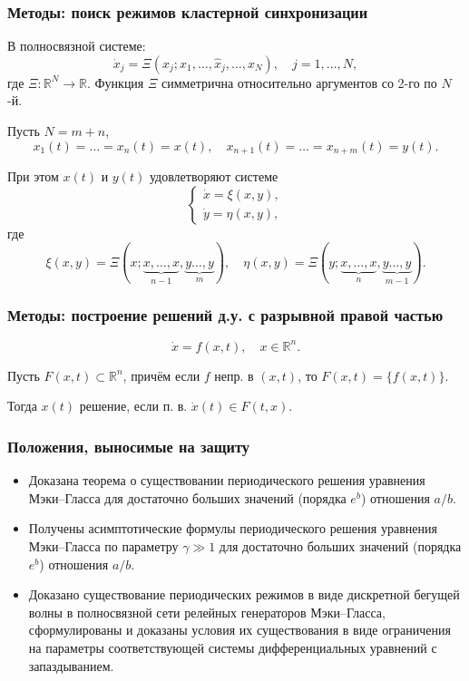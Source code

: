 \begin{frame}
	\frametitle{Методы: поиск режимов кластерной синхронизации}
	
	В полносвязной системе:
	\begin{equation*}
		\dot{x}_j = \Xi(x_j;x_1,\ldots,\hat{x}_j,\ldots,x_{N}),\quad j=1,\ldots,N,
	\end{equation*}
	где $\Xi:\mathbb{R}^{N}\to\mathbb{R}$. Функция $\Xi$ симметрична относительно аргументов со 2-го по $N$-й.
	
	\pause
	\bigskip
	
	Пусть $N = m + n$,
	\begin{equation}
		x_1(t)=\ldots=x_n(t)=x(t),\quad x_{n+1}(t)=\ldots=x_{n+m}(t)=y(t).
	\end{equation}
	
	При этом $x(t)$ и $y(t)$ удовлетворяют системе
	\[
	\begin{cases}
		\dot{x}=\xi(x,y),\\
		\dot{y}=\eta(x,y),
	\end{cases}
	\]
	где 
	\[
	\xi(x,y)=\Xi(x; \underbrace{x, \ldots, x}_{n-1},\underbrace{y \ldots, y}_{m}),\quad
	\eta(x,y)=\Xi(y; \underbrace{x, \ldots, x}_{n},\underbrace{y \ldots, y}_{m-1}).
	\]
\end{frame}

\begin{frame}
	\frametitle{Методы: построение решений д.у. с разрывной правой частью}
	
	\begin{equation*}
		\dot{x} = f(x, t), \quad x \in \mathbb{R}^n.
	\end{equation*}
	
	Пусть $F(x, t) \subset \mathbb{R}^n$, причём если $f$ непр. в $(x, t)$, то $F(x, t) = \{f(x, t)\}$.
	
	Тогда $x(t)$ решение, если п. в. $\dot{x}(t) \in F(t, x)$.
\end{frame}


\begin{frame}
    \frametitle{Положения, выносимые на защиту}

    \begin{itemize}
    	\item Доказана теорема о существовании периодического решения уравнения Мэки--Гласса для достаточно больших значений (порядка $e^b$) отношения $a / b$.
    	\item Получены асимптотические формулы периодического решения уравнения Мэки--Гласса по параметру $\gamma \gg 1$ для достаточно больших значений (порядка $e^b$) отношения $a / b$.
    	\item Доказано существование периодических режимов в виде дискретной бегущей волны в полносвязной сети релейных генераторов Мэки--Гласса, сформулированы и доказаны условия их существования в виде ограничения на параметры соответствующей системы дифференциальных уравнений с запаздыванием.
    \end{itemize}
\end{frame}

